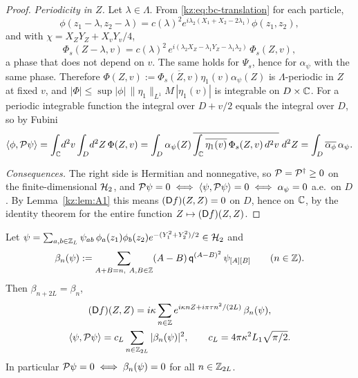 \begin{proof}
\emph{Periodicity in $Z$.} Let $\lambda\in\Lambda$. From \eqref{kz:eq:bc-translation} for each particle,
\[
\phi(z_1-\lambda,z_2-\lambda)=c(\lambda)^2e^{i\lambda_2(X_1+X_2-2\lambda_1)}\phi(z_1,z_2),
\]
and with $\chi=X_ZY_Z+X_vY_v/4$,
\begin{equation}\label{kz:eq:simul}
\Phi_s(Z-\lambda,v)=c(\lambda)^2\,e^{i(\lambda_2X_Z-\lambda_1Y_Z-\lambda_1\lambda_2)}\,\Phi_s(Z,v),
\end{equation}
a phase that does not depend on $v$. The same holds for $\Psi_s$, hence for $\alpha_\psi$ with the same
phase. Therefore $\Phi(Z,v):=\overline{\Phi_s(Z,v)}\eta_1(v)\alpha_\psi(Z)$ is $\Lambda$-periodic in $Z$ at fixed
$v$, and $|\Phi|\le\sup|\phi|\,\|\eta_1\|_{L^1}M\,|\eta_1(v)|$ is integrable on $D\times\mathbb{C}$. For a periodic
integrable function the integral over $D+v/2$ equals the integral over $D$, so by Fubini
\[
\langle\phi,\mathcal{P}\psi\rangle=\int_{\mathbb{C}}\!d^2v\int_{D}\!d^2Z\,\Phi(Z,v)
=\int_D\alpha_\psi(Z)\,\overline{\int_{\mathbb{C}}\overline{\eta_1(v)}\,\Phi_s(Z,v)\,d^2v}\;d^2Z
=\int_D\overline{\alpha_\phi}\,\alpha_\psi .
\]

\emph{Consequences.} The right side is Hermitian and nonnegative, so $\mathcal{P}=\mathcal{P}^\dagger\ge0$ on the
finite-dimensional $\mathcal{H}_2$, and $\mathcal{P}\psi=0\iff\langle\psi,\mathcal{P}\psi\rangle=0\iff\alpha_\psi=0$ a.e.\ on $D$. By
Lemma~\ref{kz:lem:A1} this means $(\mathsf{D} f)(Z,Z)=0$ on $D$, hence on $\mathbb{C}$, by the identity theorem for the
entire function $Z\mapsto(\mathsf{D} f)(Z,Z)$.
\end{proof}

\begin{lemma}\label{kz:lem:A3}
Let $\psi=\sum_{a,b\in\mathbb{Z}_L}\psi_{ab}\,\phi_a(z_1)\phi_b(z_2)e^{-(Y_1^2+Y_2^2)/2}\in\mathcal{H}_2$ and
\[
\beta_n(\psi):=\sum_{A+B=n,\ A,B\in\Z}(A-B)\,\kzq^{(A-B)^2}\,\psi_{[A][B]}\qquad(n\in\Z).
\]
Then $\beta_{n+2L}=\beta_n$,
\begin{gather*}
(\mathsf{D} f)(Z,Z)=i\kappa\sum_{n\in\mathbb{Z}}e^{i\kappa nZ+i\pi\tau n^2/(2L)}\,\beta_n(\psi),\\
\langle\psi,\mathcal{P}\psi\rangle=c_L\sum_{n\in\mathbb{Z}_{2L}}|\beta_n(\psi)|^2,\qquad c_L=4\pi\kappa^2L_1\sqrt{\pi/2}.
\end{gather*}
In particular $\mathcal{P}\psi=0\iff\beta_n(\psi)=0$ for all $n\in\mathbb{Z}_{2L}$.
\end{lemma}


